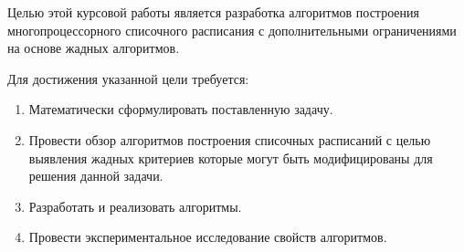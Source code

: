Целью этой курсовой работы является разработка алгоритмов построения многопроцессорного списочного расписания с дополнительными ограничениями на основе жадных алгоритмов.

Для достижения указанной цели требуется:
\begin{enumerate}
    \item Математически сформулировать поставленную задачу. 
    \item Провести обзор алгоритмов построения списочных расписаний с целью выявления жадных критериев которые могут быть модифицированы для решения данной задачи.
    \item Разработать и реализовать алгоритмы.
    \item Провести экспериментальное исследование свойств алгоритмов.
\end{enumerate}